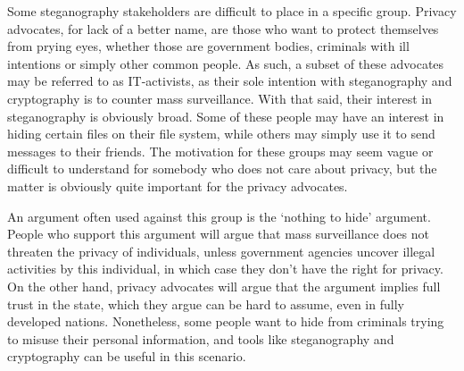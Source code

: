 Some steganography stakeholders are difficult to place in a specific group. Privacy advocates, for lack of a better name, are those who want to protect themselves from prying eyes, whether those are government bodies, criminals with ill intentions or simply other common people. As such, a subset of these advocates may be referred to as IT-activists, as their sole intention with steganography and cryptography is to counter mass surveillance. With that said, their interest in steganography is obviously broad. Some of these people may have an interest in hiding certain files on their file system, while others may simply use it to send messages to their friends. The motivation for these groups may seem vague or difficult to understand for somebody who does not care about privacy, but the matter is obviously quite important for the privacy advocates. 

An argument often used against this group is the ‘nothing to hide’ argument. People who support this argument will argue that mass surveillance does not threaten the privacy of individuals, unless government agencies uncover illegal activities by this individual, in which case they don’t have the right for privacy. On the other hand, privacy advocates will argue that the argument implies full trust in the state, which they argue can be hard to assume, even in fully developed nations. Nonetheless, some people want to hide from criminals trying to misuse their personal information, and tools like steganography and cryptography can be useful in this scenario.